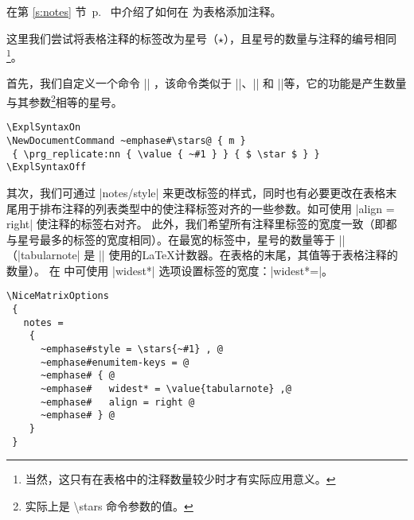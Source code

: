 \documentclass[dvipsnames]{article}%
\begin{document}
\label{ex:notes}

在第 \ref{s:notes} 节~p.~\pageref{s:notes} 中介绍了如何在   为表格添加注释。

\medskip
这里我们尝试将表格注释的标签改为星号（$\star$），且星号的数量与注释的编号相同\footnote{当然，这只有在表格中的注释数量较少时才有实际应用意义。}。

\medskip
首先，我们自定义一个命令 |\stars| ，该命令类似于 |\arabic|、|\alph| 和 |\Alph|等，它的功能是产生数量与其参数\footnote{实际上是 \textbackslash stars 命令参数的值。}相等的星号。
\begin{Verbatim}
\ExplSyntaxOn
\NewDocumentCommand ~emphase#\stars@ { m }
 { \prg_replicate:nn { \value { ~#1 } } { $ \star $ } } 
\ExplSyntaxOff
\end{Verbatim}
%

其次，我们可通过 |notes/style| 来更改标签的样式，同时也有必要更改在表格末尾用于排布注释的列表类型中的使注释标签对齐的一些参数。如可使用 |align = right| 使注释的标签右对齐。 此外，我们希望所有注释里标签的宽度一致（即都与星号最多的标签的宽度相同）。在最宽的标签中，星号的数量等于 |\value{tabularnote}|（|tabularnote| 是 |\tabularnote| 使用的\LaTeX 计数器。在表格的末尾，其值等于表格注释的数量）。 在  中可使用 |widest*| 选项设置标签的宽度：|widest*=\value{tabularnote}|。
\begin{Verbatim}
\NiceMatrixOptions 
 {
   notes = 
    {
      ~emphase#style = \stars{~#1} , @
      ~emphase#enumitem-keys = @
      ~emphase# { @
      ~emphase#   widest* = \value{tabularnote} ,@
      ~emphase#   align = right @
      ~emphase# } @
    }
 }
\end{Verbatim}
\end{document}
